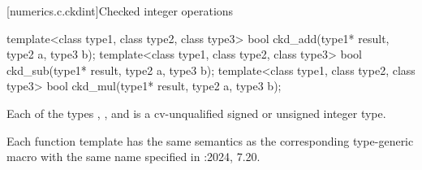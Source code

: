 \pnum
{}   %

[numerics.c.ckdint]{Checked integer operations}

%
%
%
\begin{itemdecl}
template<class type1, class type2, class type3>
  bool ckd_add(type1* result, type2 a, type3 b);
template<class type1, class type2, class type3>
  bool ckd_sub(type1* result, type2 a, type3 b);
template<class type1, class type2, class type3>
  bool ckd_mul(type1* result, type2 a, type3 b);
\end{itemdecl}

\begin{itemdescr}
\pnum
\mandates
Each of the types , , and  is a
cv-unqualified signed or unsigned integer type.

\pnum
\remarks
Each function template has the same semantics as
the corresponding type-generic macro with the same name
specified in \IsoCUndated{}:2024, 7.20.
\end{itemdescr}
